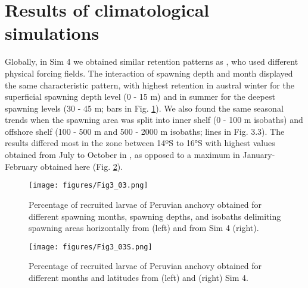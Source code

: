 \section{Results of climatological simulations}\label{Chap3Resu1}

Globally, in Sim 4 we obtained similar retention patterns as \cite{BrocLett2008}, who used different physical forcing fields. The interaction of spawning depth and month displayed the same characteristic pattern, with highest retention in austral winter for the superficial spawning depth level (0 - 15 m) and in summer for the deepest spawning levels (30 - 45 m; bars in Fig. \ref{Fig3_03}). We also found the same seasonal trends when the spawning area was split into inner shelf (0 - 100 m isobaths) and offshore shelf (100 - 500 m and 500 - 2000 m isobaths; lines in Fig. 3.3). The results differed most in the zone between 14ºS to 16°S with highest values obtained from July to October in \cite{BrocLett2008}, as opposed to a maximum in January-February obtained here (Fig. \ref{Fig3_03S}).\\

\begin{figure}[ht]
	\texttt{[image: figures/Fig3\_03.png]}
	\centering
	\caption{Percentage of recruited larvae of Peruvian anchovy obtained for different spawning months, spawning depths, and isobaths delimiting spawning areas horizontally from \cite{BrocLett2008} (left) and from Sim 4 (right).}
	\label{Fig3_03}
\end{figure}

\begin{figure}[ht]
	\texttt{[image: figures/Fig3\_03S.png]}
	\centering
	\caption{Percentage of recruited larvae of Peruvian anchovy obtained for different months and latitudes from (left) \cite{BrocLett2008} and (right) Sim 4.}
	\label{Fig3_03S}
\end{figure}

